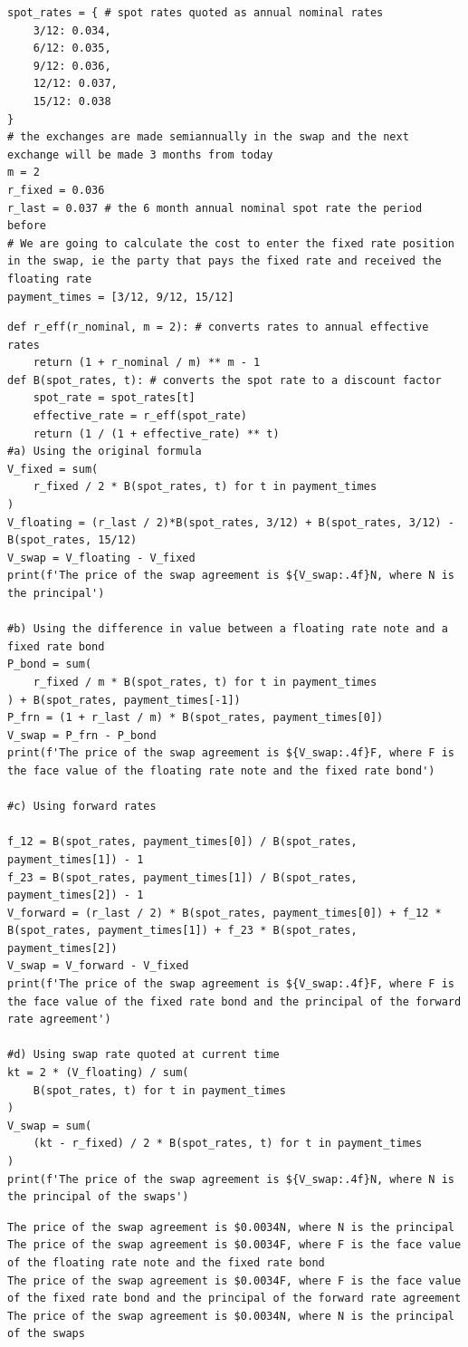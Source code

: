 \documentclass[11pt,a4paper]{article}
\begin{document}
\begin{lstlisting}
spot_rates = { # spot rates quoted as annual nominal rates
    3/12: 0.034,
    6/12: 0.035,
    9/12: 0.036,
    12/12: 0.037,
    15/12: 0.038
}
# the exchanges are made semiannually in the swap and the next exchange will be made 3 months from today
m = 2
r_fixed = 0.036
r_last = 0.037 # the 6 month annual nominal spot rate the period before
# We are going to calculate the cost to enter the fixed rate position in the swap, ie the party that pays the fixed rate and received the floating rate
payment_times = [3/12, 9/12, 15/12]
\end{lstlisting}
\begin{lstlisting}
def r_eff(r_nominal, m = 2): # converts rates to annual effective rates
    return (1 + r_nominal / m) ** m - 1
def B(spot_rates, t): # converts the spot rate to a discount factor
    spot_rate = spot_rates[t]
    effective_rate = r_eff(spot_rate)
    return (1 / (1 + effective_rate) ** t)
#a) Using the original formula
V_fixed = sum(
    r_fixed / 2 * B(spot_rates, t) for t in payment_times
)
V_floating = (r_last / 2)*B(spot_rates, 3/12) + B(spot_rates, 3/12) - B(spot_rates, 15/12)
V_swap = V_floating - V_fixed
print(f'The price of the swap agreement is ${V_swap:.4f}N, where N is the principal')

#b) Using the difference in value between a floating rate note and a fixed rate bond
P_bond = sum(
    r_fixed / m * B(spot_rates, t) for t in payment_times
) + B(spot_rates, payment_times[-1])
P_frn = (1 + r_last / m) * B(spot_rates, payment_times[0])
V_swap = P_frn - P_bond
print(f'The price of the swap agreement is ${V_swap:.4f}F, where F is the face value of the floating rate note and the fixed rate bond')

#c) Using forward rates

f_12 = B(spot_rates, payment_times[0]) / B(spot_rates, payment_times[1]) - 1
f_23 = B(spot_rates, payment_times[1]) / B(spot_rates, payment_times[2]) - 1
V_forward = (r_last / 2) * B(spot_rates, payment_times[0]) + f_12 * B(spot_rates, payment_times[1]) + f_23 * B(spot_rates, payment_times[2])
V_swap = V_forward - V_fixed
print(f'The price of the swap agreement is ${V_swap:.4f}F, where F is the face value of the fixed rate bond and the principal of the forward rate agreement')

#d) Using swap rate quoted at current time
kt = 2 * (V_floating) / sum(
    B(spot_rates, t) for t in payment_times
)
V_swap = sum(
    (kt - r_fixed) / 2 * B(spot_rates, t) for t in payment_times
)
print(f'The price of the swap agreement is ${V_swap:.4f}N, where N is the principal of the swaps')
\end{lstlisting}
\begin{lstlisting}[style=pyout]
The price of the swap agreement is $0.0034N, where N is the principal
The price of the swap agreement is $0.0034F, where F is the face value of the floating rate note and the fixed rate bond
The price of the swap agreement is $0.0034F, where F is the face value of the fixed rate bond and the principal of the forward rate agreement
The price of the swap agreement is $0.0034N, where N is the principal of the swaps
\end{lstlisting}
\end{document}
